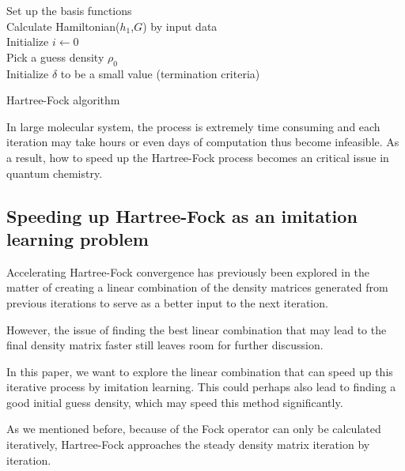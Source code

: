 \documentclass[twoside]{article}
\begin{document}
\begin{algorithm}[htb]
 \label{alg:hf}
	Set up the basis functions\\
	Calculate Hamiltonian($h_1$,$G$) by input data  \\
	Initialize $i \leftarrow	 0$ \\	
	Pick a guess density $\rho_0$ \\
	Initialize $\delta$ to be a small value (termination criteria) \\
 \caption{Hartree-Fock algorithm}
\end{algorithm}

In large molecular system, the process is extremely time consuming and each iteration may take hours or even days of computation thus become infeasible. 
As a result, how to speed up the Hartree-Fock process becomes an critical issue in quantum chemistry.



\subsection{Speeding up Hartree-Fock as an imitation learning problem}


Accelerating Hartree-Fock convergence has previously been explored in the matter of creating a linear combination of the density matrices generated from previous iterations to serve as a better input to the next iteration.\cite{Pulay1980} 

However, the issue of finding the best linear combination that may lead to the final density matrix faster still leaves room for further discussion.

In this paper,
we want to explore the linear combination that can speed up this iterative process by imitation learning. This could perhaps also lead to finding a good initial guess density, which may speed this method significantly. 


As we mentioned before,  because of the Fock operator can only be calculated iteratively, Hartree-Fock approaches the steady density matrix iteration by iteration.
\end{document}
